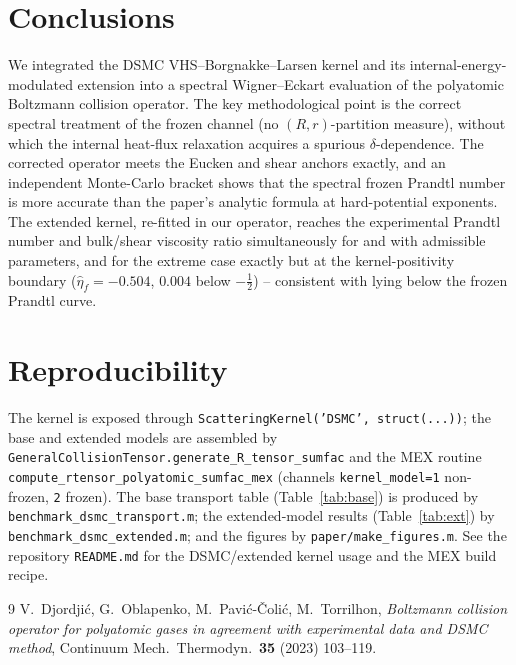 \documentclass[11pt]{article}
\newcommand{\etah}{\hat{\eta}}
\newcommand{\code}[1]{\texttt{#1}}
\begin{document}
\section{Conclusions}
\label{sec:conclusions}

We integrated the DSMC VHS--Borgnakke--Larsen kernel and its internal-energy-modulated extension
into a spectral Wigner--Eckart evaluation of the polyatomic Boltzmann collision operator. The key
methodological point is the correct spectral treatment of the frozen channel (no
$(R,r)$-partition measure), without which the internal heat-flux relaxation acquires a spurious
$\delta$-dependence. The corrected operator meets the Eucken and shear anchors exactly, and an
independent Monte-Carlo bracket shows that the spectral frozen Prandtl number is more accurate
than the paper's analytic formula at hard-potential exponents. The extended kernel, re-fitted in
our operator, reaches the experimental Prandtl number and bulk/shear viscosity ratio
simultaneously for  and  with admissible parameters, and for the extreme case
 exactly but at the kernel-positivity boundary ($\etah_f=-0.504$, $0.004$ below
$-\tfrac12$) -- consistent with  lying below the frozen Prandtl curve.

\section*{Reproducibility}
The kernel is exposed through \code{ScatteringKernel('DSMC',\,struct(...))}; the base and extended
models are assembled by \code{GeneralCollisionTensor.generate\_R\_tensor\_sumfac} and the MEX
routine \code{compute\_rtensor\_polyatomic\_sumfac\_mex} (channels \code{kernel\_model=1} non-frozen,
\code{2} frozen). The base transport table (Table~\ref{tab:base}) is produced by
\code{benchmark\_dsmc\_transport.m}; the extended-model results (Table~\ref{tab:ext}) by
\code{benchmark\_dsmc\_extended.m}; and the figures by \code{paper/make\_figures.m}. See the
repository \code{README.md} for the DSMC/extended kernel usage and the MEX build recipe.

\begin{thebibliography}{9}
V.~Djordji\'c, G.~Oblapenko, M.~Pavi\'c-\v{C}oli\'c, M.~Torrilhon,
\emph{Boltzmann collision operator for polyatomic gases in agreement with experimental data and
DSMC method}, Continuum Mech.\ Thermodyn.\ \textbf{35} (2023) 103--119.
\end{thebibliography}
\end{document}
